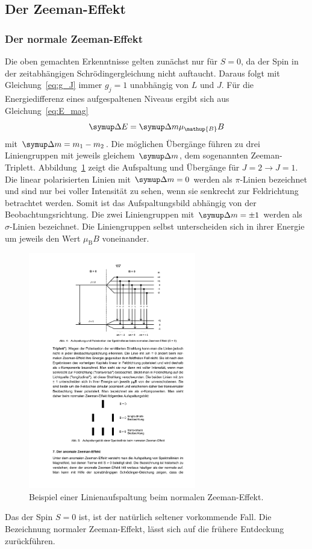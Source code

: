 \subsection{Der Zeeman-Effekt}

\subsubsection{Der normale Zeeman-Effekt}
Die oben gemachten Erkenntnisse gelten zunächst nur für $S=0$, da der Spin in der
zeitabhängigen Schrödingergleichung nicht auftaucht.
Daraus folgt mit Gleichung~\eqref{eq:g_J} immer $g_j=1$ unabhängig von $L$ und $J$.
Für die Energiedifferenz eines aufgespaltenen Niveaus ergibt sich aus
Gleichung~\eqref{eq:E_mag}
\begin{equation}
    \upD E=\upD m\mu_{\mathup{B}}B
    \label{eq:dE_norm}
\end{equation}
mit $\upD m=m_1-m_2$. Die möglichen Übergänge führen zu drei Liniengruppen mit
jeweils gleichem $\upD m$, dem sogenannten Zeeman-Triplett.
Abbildung~\ref{fig:zeeman_normal} zeigt die Aufspaltung und Übergänge für
$J=2\rightarrow J=1$.
Die linear polarisierten Linien mit $\upD m=0$ werden als $\pi$-Linien bezeichnet und sind nur
bei voller Intensität zu sehen, wenn sie senkrecht zur Feldrichtung betrachtet werden.
Somit ist das Aufspaltungsbild abhängig von der Beobachtungsrichtung.
Die zwei Liniengruppen mit $\upD m=\pm1$ werden als $\sigma$-Linien bezeichnet.
Die Liniengruppen selbst unterscheiden sich in ihrer Energie um jeweils den Wert
$\mu_{\mathup{B}}B$ voneinander.
\begin{figure}
    \centering
    \includegraphics[width=0.65\textwidth]{graphics/zeeman_normal.pdf}
    \caption{Beispiel einer Linienaufspaltung beim normalen Zeeman-Effekt.\cite{anleitung}}
    \label{fig:zeeman_normal}
\end{figure}
Das der Spin $S=0$ ist, ist der natürlich seltener vorkommende Fall. Die Bezeichnung
normaler Zeeman-Effekt, lässt sich auf die frühere Entdeckung zurückführen.

